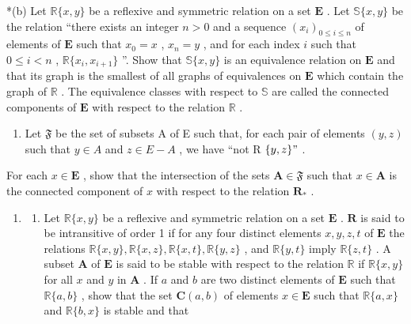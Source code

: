 *(b) Let \(\mathbb{R}\{x, y\}\) be a reflexive and symmetric relation on a set \(\mathbf{E}\) . Let \(\mathbb{S}\{x, y\}\) be the relation ``there exists an integer \(n > 0\) and a sequence \((x_i)_{0 \leqslant i \leqslant n}\) of elements of \(\mathbf{E}\) such that \(x_0 = x\) , \(x_n = y\) , and for each index \(i\) such that \(0 \leqslant i < n\) , \(\mathbb{R}\{x_i, x_{i+1}\}\) ''. Show that \(\mathbb{S}\{x, y\}\) is an equivalence relation on \(\mathbf{E}\) and that its graph is the smallest of all graphs of equivalences on \(\mathbf{E}\) which contain the graph of \(\mathbb{R}\) . The equivalence classes with respect to \(\mathbb{S}\) are called the connected components of \(\mathbf{E}\) with respect to the relation \(\mathbb{R}\) .

\begin{enumerate}
\def\labelenumi{(\alph{enumi})}
\setcounter{enumi}{2}
\tightlist
\item
  Let \(\mathfrak{F}\) be the set of subsets A of E such that, for each pair of elements \((y,z)\) such that \(y\in A\) and \(z\in E - A\) , we have ``not R \(\{y,z\} "\) .
\end{enumerate}

For each \(x \in \mathbf{E}\) , show that the intersection of the sets \(\mathbf{A} \in \mathfrak{F}\) such that \(x \in \mathbf{A}\) is the connected component of \(x\) with respect to the relation \(\mathbf{R}_{*}\) .

\begin{enumerate}
\def\labelenumi{\arabic{enumi}.}
\setcounter{enumi}{10}
\tightlist
\item
  \begin{enumerate}
  \def\labelenumii{(\alph{enumii})}
  \tightlist
  \item
    Let \(\mathbb{R}\{x, y\}\) be a reflexive and symmetric relation on a set \(\mathbf{E}\) . \(\mathbf{R}\) is said to be intransitive of order 1 if for any four distinct elements \(x, y, z, t\) of \(\mathbf{E}\) the relations \(\mathbb{R}\{x, y\}, \mathbb{R}\{x, z\}, \mathbb{R}\{x, t\}, \mathbb{R}\{y, z\}\) , and \(\mathbb{R}\{y, t\}\) imply \(\mathbb{R}\{z, t\}\) . A subset \(\mathbf{A}\) of \(\mathbf{E}\) is said to be stable with respect to the relation \(\mathbb{R}\) if \(\mathbb{R}\{x, y\}\) for all \(x\) and \(y\) in \(\mathbf{A}\) . If \(a\) and \(b\) are two distinct elements of \(\mathbf{E}\) such that \(\mathbb{R}\{a, b\}\) , show that the set \(\mathbf{C}(a, b)\) of elements \(x \in \mathbf{E}\) such that \(\mathbb{R}\{a, x\}\) and \(\mathbb{R}\{b, x\}\) is stable and that
  \end{enumerate}
\end{enumerate}

